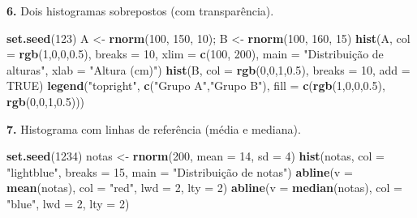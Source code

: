 \documentclass[
  portuguese,
  11pt,
  openany]{book}
\newenvironment{Shaded}{\begin{snugshade}}{\end{snugshade}}
\newcommand{\AttributeTok}[1]{\textcolor[rgb]{0.13,0.29,0.53}{#1}}
\newcommand{\ConstantTok}[1]{\textcolor[rgb]{0.56,0.35,0.01}{#1}}
\newcommand{\DecValTok}[1]{\textcolor[rgb]{0.00,0.00,0.81}{#1}}
\newcommand{\FloatTok}[1]{\textcolor[rgb]{0.00,0.00,0.81}{#1}}
\newcommand{\FunctionTok}[1]{\textcolor[rgb]{0.13,0.29,0.53}{\textbf{#1}}}
\newcommand{\NormalTok}[1]{#1}
\newcommand{\OtherTok}[1]{\textcolor[rgb]{0.56,0.35,0.01}{#1}}
\newcommand{\StringTok}[1]{\textcolor[rgb]{0.31,0.60,0.02}{#1}}
\begin{document}
\textbf{6.} Dois histogramas sobrepostos (com transparência).

\begin{Shaded}
\begin{Highlighting}[]
\FunctionTok{set.seed}\NormalTok{(}\DecValTok{123}\NormalTok{)}
\NormalTok{A }\OtherTok{\textless{}{-}} \FunctionTok{rnorm}\NormalTok{(}\DecValTok{100}\NormalTok{, }\DecValTok{150}\NormalTok{, }\DecValTok{10}\NormalTok{); B }\OtherTok{\textless{}{-}} \FunctionTok{rnorm}\NormalTok{(}\DecValTok{100}\NormalTok{, }\DecValTok{160}\NormalTok{, }\DecValTok{15}\NormalTok{)}
\FunctionTok{hist}\NormalTok{(A, }\AttributeTok{col =} \FunctionTok{rgb}\NormalTok{(}\DecValTok{1}\NormalTok{,}\DecValTok{0}\NormalTok{,}\DecValTok{0}\NormalTok{,}\FloatTok{0.5}\NormalTok{), }\AttributeTok{breaks =} \DecValTok{10}\NormalTok{, }\AttributeTok{xlim =} \FunctionTok{c}\NormalTok{(}\DecValTok{100}\NormalTok{, }\DecValTok{200}\NormalTok{),}
     \AttributeTok{main =} \StringTok{"Distribuição de alturas"}\NormalTok{, }\AttributeTok{xlab =} \StringTok{"Altura (cm)"}\NormalTok{)}
\FunctionTok{hist}\NormalTok{(B, }\AttributeTok{col =} \FunctionTok{rgb}\NormalTok{(}\DecValTok{0}\NormalTok{,}\DecValTok{0}\NormalTok{,}\DecValTok{1}\NormalTok{,}\FloatTok{0.5}\NormalTok{), }\AttributeTok{breaks =} \DecValTok{10}\NormalTok{, }\AttributeTok{add =} \ConstantTok{TRUE}\NormalTok{)}
\FunctionTok{legend}\NormalTok{(}\StringTok{"topright"}\NormalTok{, }\FunctionTok{c}\NormalTok{(}\StringTok{"Grupo A"}\NormalTok{,}\StringTok{"Grupo B"}\NormalTok{),}
       \AttributeTok{fill =} \FunctionTok{c}\NormalTok{(}\FunctionTok{rgb}\NormalTok{(}\DecValTok{1}\NormalTok{,}\DecValTok{0}\NormalTok{,}\DecValTok{0}\NormalTok{,}\FloatTok{0.5}\NormalTok{), }\FunctionTok{rgb}\NormalTok{(}\DecValTok{0}\NormalTok{,}\DecValTok{0}\NormalTok{,}\DecValTok{1}\NormalTok{,}\FloatTok{0.5}\NormalTok{)))}
\end{Highlighting}
\end{Shaded}

\textbf{7.} Histograma com linhas de referência (média e mediana).

\begin{Shaded}
\begin{Highlighting}[]
\FunctionTok{set.seed}\NormalTok{(}\DecValTok{1234}\NormalTok{)}
\NormalTok{notas }\OtherTok{\textless{}{-}} \FunctionTok{rnorm}\NormalTok{(}\DecValTok{200}\NormalTok{, }\AttributeTok{mean =} \DecValTok{14}\NormalTok{, }\AttributeTok{sd =} \DecValTok{4}\NormalTok{)}
\FunctionTok{hist}\NormalTok{(notas, }\AttributeTok{col =} \StringTok{"lightblue"}\NormalTok{, }\AttributeTok{breaks =} \DecValTok{15}\NormalTok{, }\AttributeTok{main =} \StringTok{"Distribuição de notas"}\NormalTok{)}
\FunctionTok{abline}\NormalTok{(}\AttributeTok{v =} \FunctionTok{mean}\NormalTok{(notas),   }\AttributeTok{col =} \StringTok{"red"}\NormalTok{,  }\AttributeTok{lwd =} \DecValTok{2}\NormalTok{, }\AttributeTok{lty =} \DecValTok{2}\NormalTok{)}
\FunctionTok{abline}\NormalTok{(}\AttributeTok{v =} \FunctionTok{median}\NormalTok{(notas), }\AttributeTok{col =} \StringTok{"blue"}\NormalTok{, }\AttributeTok{lwd =} \DecValTok{2}\NormalTok{, }\AttributeTok{lty =} \DecValTok{2}\NormalTok{)}
\end{Highlighting}
\end{Shaded}
\end{document}
